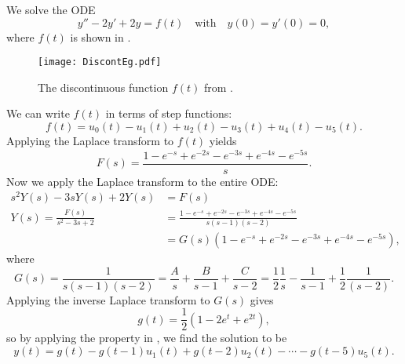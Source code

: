 \begin{eg}\label{eg:disconteg}
	We solve the ODE
	\[
	y''-2y'+2y=f(t) \quad\text{with}\quad y(0)=y'(0)=0,
	\]
	where $f(t)$ is shown in . 
	
	\begin{figure}[!ht]
		\centering
		\texttt{[image: DiscontEg.pdf]}
		\caption{The discontinuous function $f(t)$ from .}
		\label{fig:disconteg}
	\end{figure}
	
	We can write $f(t)$ in terms of step functions:
	\[
	f(t) = u_0(t) - u_1(t) + u_2(t) - u_3(t) + u_4(t) - u_5(t).
	\]
	Applying the Laplace transform to $f(t)$ yields
	\[
	F(s) = \frac{1-e^{-s}+e^{-2s}-e^{-3s}+e^{-4s}-e^{-5s}}{s}.
	\]
	Now we apply the Laplace transform to the entire ODE:
	\begin{align*}
		s^2Y(s) - 3sY(s) + 2Y(s) &= F(s) \\
		Y(s) = \frac{F(s)}{s^2-3s+2} &= \frac{1-e^{-s}+e^{-2s}-e^{-3s}+e^{-4s}-e^{-5s}}{s(s-1)(s-2)} \\
		&= G(s)(1-e^{-s}+e^{-2s}-e^{-3s}+e^{-4s}-e^{-5s}),
	\end{align*}
	where
	\[
	G(s) = \frac{1}{s(s-1)(s-2)} = \frac{A}{s} + \frac{B}{s-1} + \frac{C}{s-2} = \frac12\frac{1}{s} - \frac{1}{s-1} + \frac12\frac{1}{(s-2)}.
	\]
	Applying the inverse Laplace transform to $G(s)$ gives
	\[
	g(t) = \frac12\left(1 - 2e^t + e^{2t}\right),
	\]
	so by applying the property in , we find the solution to be
	\[
	y(t) = g(t) - g(t-1)u_1(t) + g(t-2)u_2(t) - \cdots - g(t-5)u_5(t).
	\]
\end{eg}


